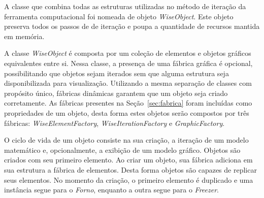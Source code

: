 A classe que combina todas as estruturas utilizadas no método de iteração da ferramenta computacional foi nomeada de objeto \textit{WiseObject}. Este objeto preserva todos os passos de de iteração e poupa a quantidade de recursos mantida em memória. 

A classe \textit{WiseObject} é composta por um coleção de elementos e objetos gráficos equivalentes entre si. Nessa classe, a presença de uma fábrica gráfica é opcional, possibilitando que objetos sejam iterados sem que alguma estrutura seja disponibilizada para visualização. Utilizando a mesma separação de classes com propósito único, fábricas dinâmicas garantem que um objeto seja criado corretamente. As fábricas presentes na Seção~\ref{sec:fabrica} foram incluídas como propriedades de um objeto, desta forma estes objetos serão compostos por três fábricas: \textit{WiseElementFactory}, \textit{WiseIterationFactory} e \textit{GraphicFactory}.


O ciclo de vida de um objeto consiste na sua criação, a iteração de um modelo matemático e, opcionalmente, a exibição de um modelo gráfico. Objetos são criados com seu primeiro elemento. Ao criar um objeto, sua fábrica adiciona em sua estrutura a fábrica de elementos. Desta forma objetos são capazes de replicar seus elementos. No momento da criação, o primeiro elemento é duplicado e uma instância segue para o \textit{Forno}, enquanto a outra segue para o \textit{Freezer}.

